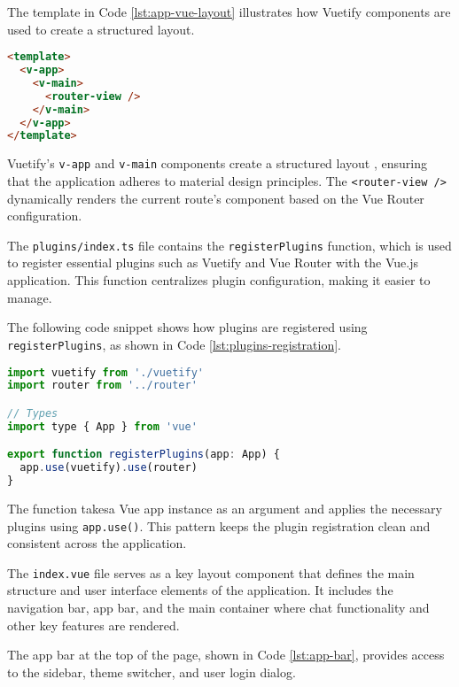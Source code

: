 The template in Code \ref{lst:app-vue-layout} illustrates how Vuetify components are used to create a structured layout.

\begin{lstlisting}[language=HTML, caption={Setting Up the Root Layout (\texttt{App.vue})},
  firstnumber=1,label={lst:app-vue-layout}]
<template>
  <v-app>
    <v-main>
      <router-view />
    </v-main>
  </v-app>
</template>
\end{lstlisting}

Vuetify’s \texttt{v-app} and \texttt{v-main} components create a structured layout
, ensuring that the application adheres to material design principles.
The \texttt{<router-view />} dynamically renders the current route’s component based on the Vue Router configuration.

The \texttt{plugins/index.ts} file contains the \texttt{registerPlugins} function, which is used to
register essential plugins such as Vuetify and Vue Router with
the Vue.js application. This function centralizes plugin configuration, making it easier to manage.

The following code snippet shows how plugins are registered using
\texttt{registerPlugins}, as shown in Code \ref{lst:plugins-registration}.

\begin{lstlisting}[language=JavaScript, caption={Registering Essential Plugins (\texttt{plugins/index.ts})},
  firstnumber=8,label={lst:plugins-registration}]
import vuetify from './vuetify'
import router from '../router'

// Types
import type { App } from 'vue'

export function registerPlugins(app: App) {
  app.use(vuetify).use(router)
}
\end{lstlisting}

The function takesa Vue app instance as an argument and applies the necessary plugins using \texttt{app.use()}.
This pattern keeps the plugin registration clean and consistent across the application.

The \texttt{index.vue} file serves as a key layout component that defines the main structure
and user interface elements of the application. It includes the navigation bar, app bar, and the main container
where chat functionality and other key features are rendered.

The app bar at the top of the page, shown in Code \ref{lst:app-bar}, provides access to the sidebar, theme switcher, and
user login dialog.

